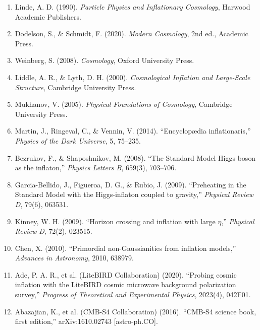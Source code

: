 \documentclass[a4paper, 11pt]{article}
\begin{document}
\begin{enumerate}
\item Linde, A. D. (1990). \textit{Particle Physics and Inflationary Cosmology},
Harwood Academic Publishers.

\item Dodelson, S., \& Schmidt, F. (2020). \textit{Modern Cosmology}, 2nd ed.,
Academic Press.

\item Weinberg, S. (2008). \textit{Cosmology}, Oxford University Press.

\item Liddle, A. R., \& Lyth, D. H. (2000). \textit{Cosmological Inflation and Large-Scale
Structure}, Cambridge University Press.

\item Mukhanov, V. (2005). \textit{Physical Foundations of Cosmology}, Cambridge University Press.

\item Martin, J., Ringeval, C., \& Vennin, V. (2014). ``Encyclopædia inflationaris,''
\textit{Physics of the Dark Universe}, 5, 75--235.

\item Bezrukov, F., \& Shaposhnikov, M. (2008). ``The Standard Model Higgs boson as the
inflaton,'' \textit{Physics Letters B}, 659(3), 703--706.

\item Garcia-Bellido, J., Figueroa, D. G., \& Rubio, J. (2009). ``Preheating in the
Standard Model with the Higgs-inflaton coupled to gravity,'' \textit{Physical Review D},
79(6), 063531.

\item Kinney, W. H. (2009). ``Horizon crossing and inflation with large $\eta$,''
\textit{Physical Review D}, 72(2), 023515.

\item Chen, X. (2010). ``Primordial non-Gaussianities from inflation models,''
\textit{Advances in Astronomy}, 2010, 638979.

\item Ade, P. A. R., et al. (LiteBIRD Collaboration) (2020). ``Probing cosmic inflation
with the LiteBIRD cosmic microwave background polarization survey,''
\textit{Progress of Theoretical and Experimental Physics}, 2023(4), 042F01.

\item Abazajian, K., et al. (CMB-S4 Collaboration) (2016). ``CMB-S4 science book,
first edition,'' arXiv:1610.02743 [astro-ph.CO].
\end{enumerate}
\end{document}
